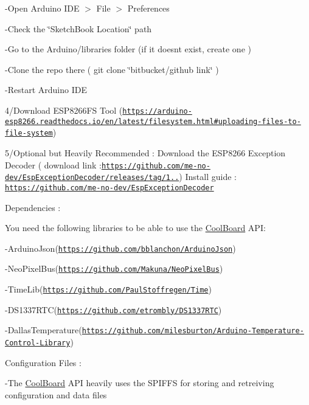 -\/\+Open Arduino I\+DE $>$ File $>$ Preferences

-\/\+Check the \char`\"{}\+Sketch\+Book Location\char`\"{} path

-\/\+Go to the Arduino/libraries folder (if it doesn\textquotesingle{}t exist, create one )

-\/\+Clone the repo there ( git clone \char`\"{}bitbucket/github link\char`\"{} )

-\/\+Restart Arduino I\+DE

4/\+Download E\+S\+P8266\+FS Tool (\href{https://arduino-esp8266.readthedocs.io/en/latest/filesystem.html#uploading-files-to-file-system}{\tt https\+://arduino-\/esp8266.\+readthedocs.\+io/en/latest/filesystem.\+html\#uploading-\/files-\/to-\/file-\/system})

5/\+Optional but Heavily Recommended \+: Download the E\+S\+P8266 Exception Decoder ( download link \+:\href{https://github.com/me-no-dev/EspExceptionDecoder/releases/tag/1.0.6}{\tt https\+://github.\+com/me-\/no-\/dev/\+Esp\+Exception\+Decoder/releases/tag/1..}) Install guide \+: \href{https://github.com/me-no-dev/EspExceptionDecoder}{\tt https\+://github.\+com/me-\/no-\/dev/\+Esp\+Exception\+Decoder}

Dependencies \+:

You need the following libraries to be able to use the \hyperlink{class_cool_board}{Cool\+Board} A\+PI\+:

-\/\+Arduino\+Json(\href{https://github.com/bblanchon/ArduinoJson}{\tt https\+://github.\+com/bblanchon/\+Arduino\+Json})

-\/\+Neo\+Pixel\+Bus(\href{https://github.com/Makuna/NeoPixelBus}{\tt https\+://github.\+com/\+Makuna/\+Neo\+Pixel\+Bus})

-\/\+Time\+Lib(\href{https://github.com/PaulStoffregen/Time}{\tt https\+://github.\+com/\+Paul\+Stoffregen/\+Time})

-\/\+D\+S1337\+R\+TC(\href{https://github.com/etrombly/DS1337RTC}{\tt https\+://github.\+com/etrombly/\+D\+S1337\+R\+TC})

-\/\+Dallas\+Temperature(\href{https://github.com/milesburton/Arduino-Temperature-Control-Library}{\tt https\+://github.\+com/milesburton/\+Arduino-\/\+Temperature-\/\+Control-\/\+Library})

Configuration Files \+:

-\/\+The \hyperlink{class_cool_board}{Cool\+Board} A\+PI heavily uses the S\+P\+I\+F\+FS for storing and retreiving configuration and data files

